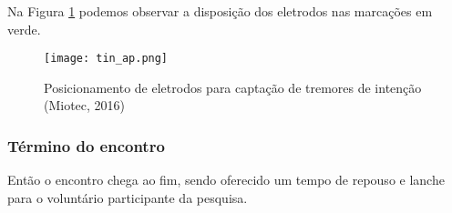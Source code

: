 \documentclass[a4paper,12pt]{report}
\begin{document}
Na Figura \ref{fig5} podemos observar a disposição dos eletrodos nas marcações em verde.

\begin{figure}[!h]
\centering
\texttt{[image: tin\_ap.png]}
\caption{Posicionamento de eletrodos para captação de tremores de intenção (Miotec, 2016)}\label{fig5}
\end{figure}

\subsubsection*{Término do encontro}

Então o encontro chega ao fim, sendo oferecido um tempo de repouso e lanche para o voluntário participante da pesquisa.


%
\end{document}
